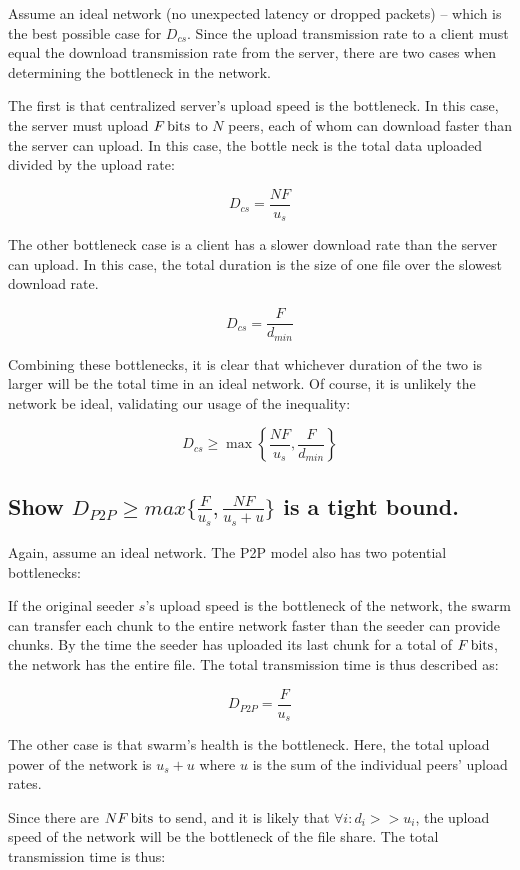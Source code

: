 \documentclass[a4paper]{article}
\begin{document}
Assume an ideal network (no unexpected latency or dropped packets) -- which is the best possible case for $D_{cs}$. Since the upload transmission rate to a client must equal the download transmission rate from the server, there are two cases when determining the bottleneck in the network.

The first is that centralized server's upload speed is the bottleneck. In this case, the server must upload $\unit[F]{bits}$ to $N$ peers, each of whom can download faster than the server can upload. In this case, the bottle neck is the total data uploaded divided by the upload rate:

$$D_{cs} = \frac{NF}{u_s}$$

The other bottleneck case is a client has a slower download rate than the server can upload. In this case, the total duration is the size of one file over the slowest download rate.

$$D_{cs} = \frac{F}{d_{min}}$$

Combining these bottlenecks, it is clear that whichever duration of the two is larger will be the total time in an ideal network. Of course, it is unlikely the network be ideal, validating our usage of the inequality:

$$D_{cs} \geq \max \left\{\frac{NF}{u_s}, \frac{F}{d_{min}}\right\}$$



\subsection{Show $D_{P2P} \geq max\{ \frac{F}{u_{s}}, \frac{NF}{u_s+u} \} $ is a tight bound.}

Again, assume an ideal network. The P2P model also has two potential bottlenecks:

If the original seeder $s$'s upload speed is the bottleneck of the network, the swarm can transfer each chunk to the entire network faster than the seeder can provide chunks. By the time the seeder has uploaded its last chunk for a total of $\unit[F]{bits}$, the network has the entire file. The total transmission time is thus described as:

$$D_{P2P} = \frac{F}{u_s}$$

The other case is that swarm's health is the bottleneck. Here, the total upload power of the network is $u_s + u$ where $u$ is the sum of the individual peers' upload rates.

Since there are $\unit[NF]{bits}$ to send, and it is likely that $\forall i: d_i >> u_i$, the upload speed of the network will be the bottleneck of the file share. The total transmission time is thus:
\end{document}
